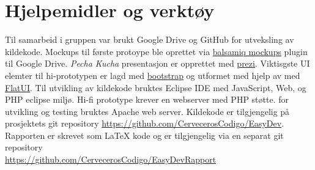 \section{Hjelpemidler og verktøy}
Til samarbeid i gruppen var brukt Google Drive og GitHub for utveksling av kildekode. Mockups til første protoype ble oprettet via \href{https://balsamiq.com/}{balsamiq mockups} plugin til Google Drive. \textit{Pecha Kucha} presentasjon er opprettet med \href{https://prezi.com/z_1ipfrf4m_3/skolelinux-pa-ny-mate/}{prezi}. Viktisgste UI elemter til hi-prototypen er lagd med \href{http://getbootstrap.com/}{bootstrap} og utformet med hjelp av med \href{http://designmodo.github.io/Flat-UI/}{FlatUI}. Til utvikling av kildekode bruktes Eclipse IDE med JavaScript, Web, og PHP eclipse miljø. Hi-fi prototype krever en webserver med PHP støtte. for utvikling og testing bruktes Apache web server. Kildekode er tilgjengelig på prosjektets git repository
\href{https://github.com/CervecerosCodigo/EasyDev}{https://github.com/CervecerosCodigo/EasyDev}.
Rapporten er skrevet som \LaTeX{} kode og er tilgjengelig via en separat git repository \\ \href{https://github.com/CervecerosCodigo/EasyDevRapport}{https://github.com/CervecerosCodigo/EasyDevRapport}

